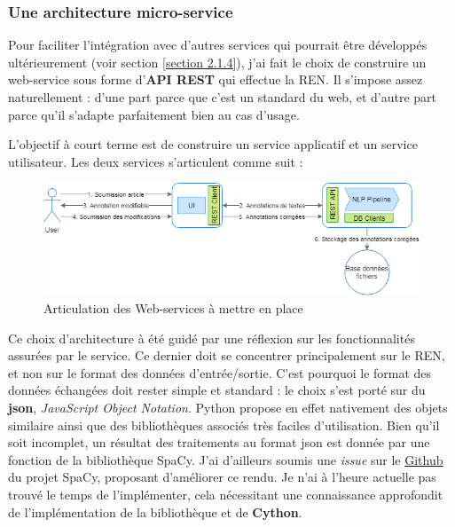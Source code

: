 \subsubsection{Une architecture micro-service}
Pour faciliter l'intégration avec d'autres services qui pourrait être développés ultérieurement (voir section \ref{section 2.1.4}), j'ai fait le choix de construire un web-service sous forme d'\textbf{API REST} qui effectue la REN. Il s'impose assez naturellement : d'une part parce que c'est un standard du web, et d'autre part parce qu'il s'adapte parfaitement bien au cas d'usage.
\newline

L'objectif à court terme est de construire un service applicatif et un service utilisateur. Les deux services s'articulent comme suit :
\vspace{20pt}
\begin{figure}[H]
    \centering
\includegraphics[scale=0.62]{images/Archi-pipeline-web.png}
    \caption{Articulation des Web-services à mettre en place}
    \label{fig:archi-pipeline-web}
\end{figure}

Ce choix d'architecture à été guidé par une réflexion sur les fonctionnalités assurées par le service. Ce dernier doit se concentrer principalement sur le REN, et non sur le format des données d'entrée/sortie. C'est pourquoi le format des données échangées doit rester simple et standard : le choix s'est porté sur du \textbf{json}, \textit{JavaScript Object Notation}. Python propose en effet nativement des objets similaire ainsi que des bibliothèques associés très faciles d'utilisation. Bien qu'il soit incomplet, un résultat des traitements au format json est donnée par une fonction de la bibliothèque SpaCy. J'ai d'ailleurs soumis une \textit{issue} sur le \href{https://github.com/explosion/spaCy/issues/3987}{Github} du projet SpaCy, proposant d'améliorer ce rendu. Je n'ai à l'heure actuelle pas trouvé le temps de l'implémenter, cela nécessitant une connaissance approfondit de l'implémentation de la bibliothèque et de \textbf{Cython}.

